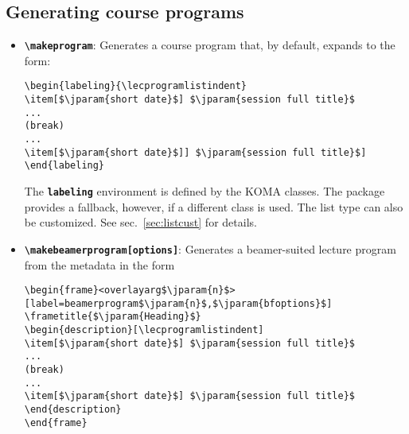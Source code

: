 \documentclass[english]{article}
\newcommand*\jmacro[1]{\textbf{\texttt{#1}}}
\newcommand*\jcsmacro[1]{\jmacro{\textbackslash{#1}}}
\newcommand*\jparam[1]{\angus #1\angud}
\begin{document}
\subsection{Generating course programs}\label{subsec:genprog}
\label{sec:lecprog}
\begin{itemize}
\item \jcsmacro{makeprogram}: Generates a course program that, by default,
expands to the form:
\begin{lstlisting}[language={[LaTeX]TeX},basicstyle={\small\ttfamily},
                   frame=single,escapechar=\$]
\begin{labeling}{\lecprogramlistindent}
\item[$\jparam{short date}$] $\jparam{session full title}$
...
(break)
...
\item[$\jparam{short date}$]] $\jparam{session full title}$]
\end{labeling}
\end{lstlisting}

The \jmacro{labeling} environment is defined by the KOMA classes.
The package provides a fallback, however, if a different class is used.
The list type can also be customized. See sec.~\ref{sec:listcust} for details.

\item \jcsmacro{makebeamerprogram[\jparam{options}]}: Generates
a beamer-suited lecture program from the metadata in the form
\begin{lstlisting}[language={[LaTeX]TeX},basicstyle={\small\ttfamily},
                   frame=single,escapechar=\$,moretexcs={[1]{frametitle}}]
\begin{frame}<overlayarg$\jparam{n}$>[label=beamerprogram$\jparam{n}$,$\jparam{bfoptions}$]
\frametitle{$\jparam{Heading}$}
\begin{description}[\lecprogramlistindent]
\item[$\jparam{short date}$] $\jparam{session full title}$
...
(break)
...
\item[$\jparam{short date}$] $\jparam{session full title}$
\end{description}
\end{frame}
\end{lstlisting}


\end{itemize}
\end{document}

